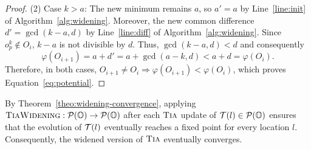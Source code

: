 \begin{proof}
    \noindent
    (2) Case $k > a$:
    The new minimum remains $a$, so $a' = a$ by Line~\ref{line:init} of Algorithm~\ref{alg:widening}.
    Moreover, the new common difference $d' = \gcd(k - a, d)$ by Line~\ref{line:diff} of Algorithm~\ref{alg:widening}.
    Since $o_p^k \notin O_i$, $k-a$ is not divisible by $d$.
    Thus, $\gcd(k - a, d) < d$ and consequently
    \[
    \varphi(O_{i+1}) = a + d' = a + \gcd(a - k, d) < a + d = \varphi(O_i).
    \]
    Therefore, in both cases, $O_{i+1} \neq O_i \Rightarrow
    \varphi(O_{i+1}) < \varphi(O_i)$, which proves Equation~\eqref{eq:potential}.
\end{proof}

By Theorem~\ref{theo:widening-convergence}, applying $\textsc{TiaWidening} : \mathcal{P}(\mathbb{O}) \to \mathcal{P}(\mathbb{O})$ after each $\textsc{Tia}$ update of $\mathcal{T}(l) \in \mathcal{P}(\mathbb{O})$ ensures that the evolution of $\mathcal{T}(l)$ eventually reaches a fixed point for every location $l$.
Consequently, the widened version of $\textsc{Tia}$ eventually converges.